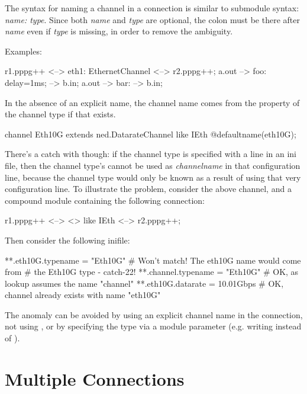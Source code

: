 The syntax for naming a channel in a connection is similar to submodule syntax:
\textit{name: type}. Since both \textit{name} and \textit{type} are optional,
the colon must be there after \textit{name} even if \textit{type} is missing,
in order to remove the ambiguity.

Examples:

\begin{ned}
r1.pppg++ <--> eth1: EthernetChannel <--> r2.pppg++;
a.out --> foo: {delay=1ms;} --> b.in;
a.out --> bar: --> b.in;
\end{ned}

In the absence of an explicit name, the channel name comes from the
 property of the channel type if that exists.

\begin{ned}
channel Eth10G extends ned.DatarateChannel like IEth {
    @defaultname(eth10G);
}
\end{ned}

There's a catch with  though: if the channel type is
specified with a  line in an ini file, then
the channel type's  cannot be used as \textit{channelname}
in that configuration line, because the channel type would only be known as a
result of using that very configuration line. To illustrate the problem,
consider the above  channel, and a compound module containing the
following connection:

\begin{ned}
r1.pppg++ <--> <> like IEth <--> r2.pppg++;
\end{ned}

Then consider the following inifile:

\begin{inifile}
**.eth10G.typename = "Eth10G"   # Won't match! The eth10G name would come from
                                #   the Eth10G type - catch-22!
**.channel.typename = "Eth10G"  # OK, as lookup assumes the name "channel"
**.eth10G.datarate = 10.01Gbps  # OK, channel already exists with name "eth10G"
\end{inifile}

The anomaly can be avoided by using an explicit channel name in the connection,
not using , or by specifying the type via a module parameter
(e.g. writing  instead of ).



\section{Multiple Connections}
\label{sec:ch-ned-lang:multiple-connections}

